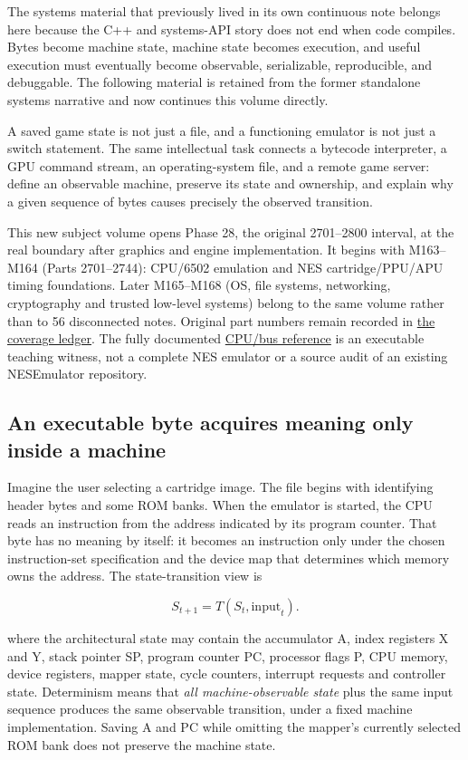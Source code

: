 The systems material that previously lived in its own continuous note belongs here because the C++ and systems-API story does not end when code compiles. Bytes become machine state, machine state becomes execution, and useful execution must eventually become observable, serializable, reproducible, and debuggable. The following material is retained from the former standalone systems narrative and now continues this volume directly.

A saved game state is not just a file, and a functioning emulator is not just a switch statement. The same intellectual task connects a bytecode interpreter, a GPU command stream, an operating-system file, and a remote game server: define an observable machine, preserve its state and ownership, and explain why a given sequence of bytes causes precisely the observed transition.

This new subject volume opens Phase 28, the original 2701--2800 interval, at the real boundary after graphics and engine implementation. It begins with M163--M164 (Parts 2701--2744): CPU/6502 emulation and NES cartridge/PPU/APU timing foundations. Later M165--M168 (OS, file systems, networking, cryptography and trusted low-level systems) belong to the same volume rather than to 56 disconnected notes. Original part numbers remain recorded in \hyperref[appendix-fd090d982a15]{the coverage ledger}. The fully documented \href{tools/labs/phase28_emulator_core_lab.cpp}{CPU/bus reference} is an executable teaching witness, not a complete NES emulator or a source audit of an existing NESEmulator repository.

\subsection{An executable byte acquires meaning only inside a machine}\label{an-executable-byte-acquires-meaning-only-inside-a-machine}

Imagine the user selecting a cartridge image. The file begins with identifying header bytes and some ROM banks. When the emulator is started, the CPU reads an instruction from the address indicated by its program counter. That byte has no meaning by itself: it becomes an instruction only under the chosen instruction-set specification and the device map that determines which memory owns the address. The state-transition view is

\[
S_{t+1}=T(S_t,\mathrm{input}_t).
\]

where the architectural state may contain the accumulator A, index registers X and Y, stack pointer SP, program counter PC, processor flags P, CPU memory, device registers, mapper state, cycle counters, interrupt requests and controller state. Determinism means that \emph{all machine-observable state} plus the same input sequence produces the same observable transition, under a fixed machine implementation. Saving A and PC while omitting the mapper's currently selected ROM bank does not preserve the machine state.

